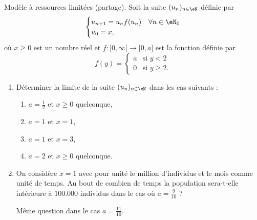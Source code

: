 
\begin{exercice}\label{exoTD3-0008}

	Modèle à ressources limitées (partage). Soit la suite $(u_n)_{n\in\eN}$ définie par
	\begin{equation}
		\begin{cases}
			u_{n+1}=u_nf(u_n)	&	\text{$\forall n\in\eN_0$}\\
			u_0=x,
		\end{cases}
	\end{equation}
	où $x\geq 0$ est un nombre réel et $f\colon \mathopen[ 0 , \infty [\to \mathopen[ 0 , a \mathclose]$ est la fonction définie par
	\begin{equation}
		f(y)=\begin{cases}
			a	&	\text{si $y<2$}\\
			0	&	 \text{si $y\geq 2$.}
		\end{cases}
	\end{equation}
	\begin{enumerate}
		\item
			Déterminer la limite de la suite $(u_n)_{n\in\eN}$ dans les cas suivants :
			\begin{enumerate}
				\item
					$a=\frac{ 1 }{2}$ et $x\geq 0$ quelconque,
				\item
					$a=1$ et $x=1$,
				\item
					$a=1$ et $x=3$,
				\item
					$a=2$ et $x\geq 0$ quelconque.
			\end{enumerate}
		\item
			On considère $x=1$ avec pour unité le million d'individus et le mois comme unité de temps. Au bout de combien de temps la population sera-t-elle intérieure à $100.000$ individus dans le cas où $a=\frac{ 9 }{ 10 }$ ?

			Même question dans le cas $a=\frac{ 11 }{ 10 }$.
	\end{enumerate}
	

\end{exercice}
